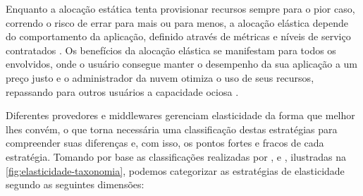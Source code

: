 \documentclass[english,brazilian]{UNISINOSmonografia} %
\begin{document}
Enquanto a alocação estática tenta provisionar recursos sempre para o pior caso, correndo o risco de errar para mais ou para menos, a alocação elástica depende do comportamento da aplicação, definido através de métricas e níveis de serviço contratados \cite{Righi2013}. 
Os benefícios da alocação elástica se manifestam para todos os envolvidos, onde o usuário consegue manter o desempenho da sua aplicação a um preço justo e o administrador da nuvem otimiza o uso de seus recursos, repassando para outros usuários a capacidade ociosa \cite{Raveendran2011,Righi2013,HennessyPatterson2013}.


Diferentes provedores e middlewares gerenciam elasticidade da forma que melhor lhes convém, o que torna necessária uma classificação destas estratégias para compreender suas diferenças e, com isso, os pontos fortes e fracos de cada estratégia.
Tomando por base as classificações realizadas por ,  e , ilustradas na \autoref{fig:elasticidade-taxonomia}, podemos categorizar as estratégias de elasticidade segundo as seguintes dimensões:
\end{document}
